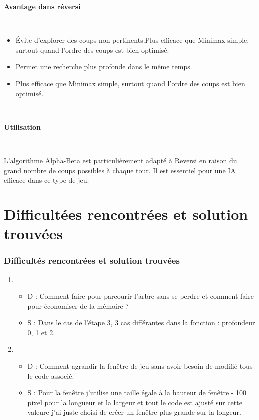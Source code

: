 \documentclass[9pt]{beamer}
\begin{document}
\begin{frame}
  \textbf{Avantage dans réversi}
  
  ~

  \begin{itemize}
    \item Évite d’explorer des coups non pertinents.Plus efficace que Minimax simple, surtout quand l’ordre des coups est bien optimisé.
    \item Permet une recherche plus profonde dans le même temps.
    \item Plus efficace que Minimax simple, surtout quand l’ordre des coups est bien optimisé.
  \end{itemize}

  ~


  \textbf{Utilisation}

  ~

  L’algorithme Alpha-Beta est particulièrement adapté à Reversi en raison du grand nombre de coups possibles à chaque tour. Il est essentiel pour une IA efficace dans ce type de jeu.
\end{frame}

\section{Difficultées rencontrées et solution trouvées}
\begin{frame}
  \frametitle{Difficultés rencontrées et solution trouvées}
  \begin{enumerate}
    \item
    \begin{itemize}
      \item D : Comment faire pour parcourir l'arbre sans se perdre et comment faire pour économiser de la mémoire ?
      \item S : Dans le cas de l'étape 3, 3 cas différantes dans la fonction : profondeur 0, 1 et 2.   
    \end{itemize}
    \item
    \begin{itemize}
      \item D : Comment agrandir la fenêtre de jeu sans avoir besoin de modifié tous le code associé.
      \item S : Pour la fenêtre j'utilise une taille égale  à la hauteur de fenêtre - 100 pixel pour la longueur et la largeur et tout le code est ajusté sur cette valeure j'ai juste choisi de créer un fenêtre plus grande sur la longeur.   
      \end{itemize}
  \end{enumerate}
\end{frame}
\end{document}
